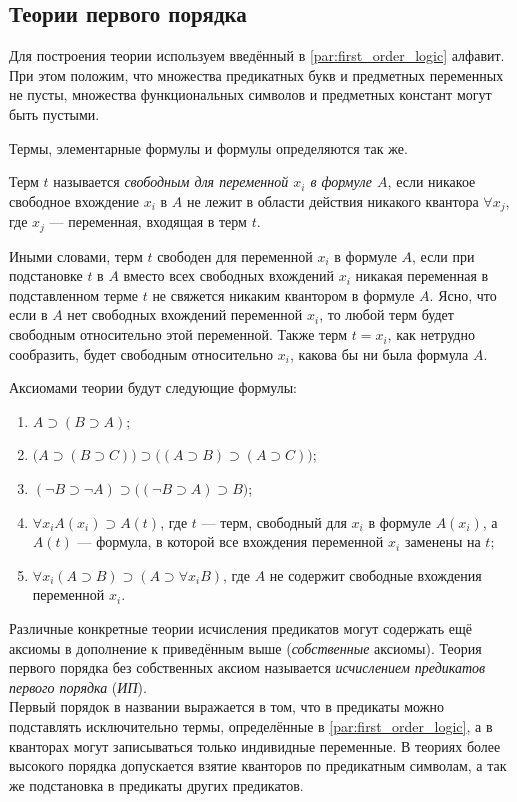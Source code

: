 \subsection{Теории первого порядка}
Для построения теории используем введённый в \ref{par:first_order_logic} алфавит. При этом положим, что множества предикатных букв и предметных переменных не пусты, множества функциональных символов и предметных констант могут быть пустыми.

Термы, элементарные формулы и формулы определяются так же.

\begin{definition*}
    Терм $t$ называется \textit{свободным для переменной $x_i$ в формуле $A$}, если никакое свободное вхождение $x_i$ в $A$ не лежит в области действия никакого квантора $\forall x_j$, где $x_j$ --- переменная, входящая в терм $t$.
\end{definition*}
Иными словами, терм $t$ свободен для переменной $x_i$ в формуле $A$, если при подстановке $t$ в $A$ вместо всех свободных вхождений $x_i$ никакая переменная в подставленном терме $t$ не свяжется никаким квантором в формуле $A$. Ясно, что если в $A$ нет свободных вхождений переменной $x_i$, то любой терм будет свободным относительно этой переменной. Также терм $t = x_i$, как нетрудно сообразить, будет свободным относительно $x_i$, какова бы ни была формула $A$.

Аксиомами теории будут следующие формулы:
\begin{enumerate}[label=(А\arabic*)]
    \item $A \supset (B \supset A)$;
    \item $\big(A \supset (B \supset C)\big) \supset \big((A \supset B) \supset (A \supset C)\big)$;
    \item $(\neg B \supset \neg A) \supset \big((\neg B \supset A) \supset B\big)$;
    \item $\forall x_iA(x_i) \supset A(t)$, где $t$ --- терм, свободный для $x_i$ в формуле $A(x_i)$, а $A(t)$ --- формула, в которой все вхождения переменной $x_i$ заменены на $t$;
    \item $\forall x_i(A \supset B) \supset (A \supset \forall x_iB)$, где $A$ не содержит свободные вхождения переменной $x_i$.
\end{enumerate}
Различные конкретные теории исчисления предикатов могут содержать ещё аксиомы в дополнение к приведённым выше (\textit{собственные} аксиомы). Теория первого порядка без собственных аксиом называется \textit{исчислением предикатов первого порядка} (\textit{ИП}). \\
Первый порядок в названии выражается в том, что в предикаты можно подставлять исключительно термы, определённые в \ref{par:first_order_logic}, а в кванторах могут записываться только индивидные переменные. В теориях более высокого порядка допускается взятие кванторов по предикатным символам, а так же подстановка в предикаты других предикатов.


